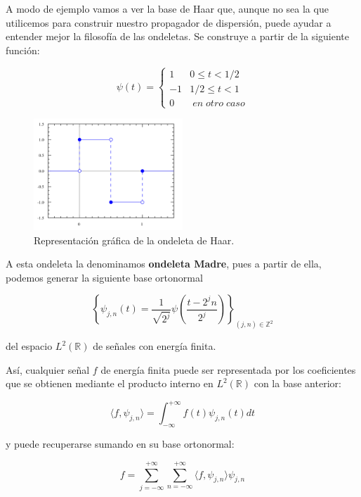 \medskip

\noindent A modo de ejemplo vamos a ver la base de Haar que, aunque no sea la que utilicemos para construir nuestro propagador de dispersión, puede ayudar a entender mejor la filosofía de las ondeletas. Se construye a partir de la siguiente función: 

$$ \psi(t)= \begin{cases} 
      1 & 0\leq t < 1/2 \\
      -1 & 1/2\leq t < 1 \\
      0 & \; en \; otro \; caso
   \end{cases}$$

\begin{figure}[!h]
  \centering
  \includegraphics[width=0.5\textwidth]{img/Haar_wavelet.png}
  \caption{Representación gráfica de la ondeleta de Haar.}
  \label{fig:Ondeleta_de_Haar}
\end{figure}

\noindent A esta ondeleta la denominamos \textbf{ondeleta Madre}, pues a partir de ella, podemos generar la siguiente base ortonormal

\medskip

$$\left \lbrace \psi_{j,n}(t)= \frac{1}{\sqrt{2^j}} \psi\left(\frac{t-2^jn}{2^j}\right) \right\rbrace_{(j,n) \in \mathbb{Z}^2}$$

\noindent del espacio $L^2(\mathbb{R})$ de señales con energía finita.

\noindent Así, cualquier señal $f$ de energía finita puede ser representada por los coeficientes que se obtienen mediante el producto interno en $L^2(\mathbb{R})$ con la base anterior: 

$$\langle f,\psi_{j,n} \rangle =\int_{-\infty}^{+\infty} f(t) \psi_{j,n} (t) dt  $$

\noindent y puede recuperarse sumando en su base ortonormal:

$$f=\sum_{j=-\infty}^{+\infty}\sum_{n=-\infty}^{+\infty}  \langle f,\psi_{j,n} \rangle \psi_{j,n} $$

